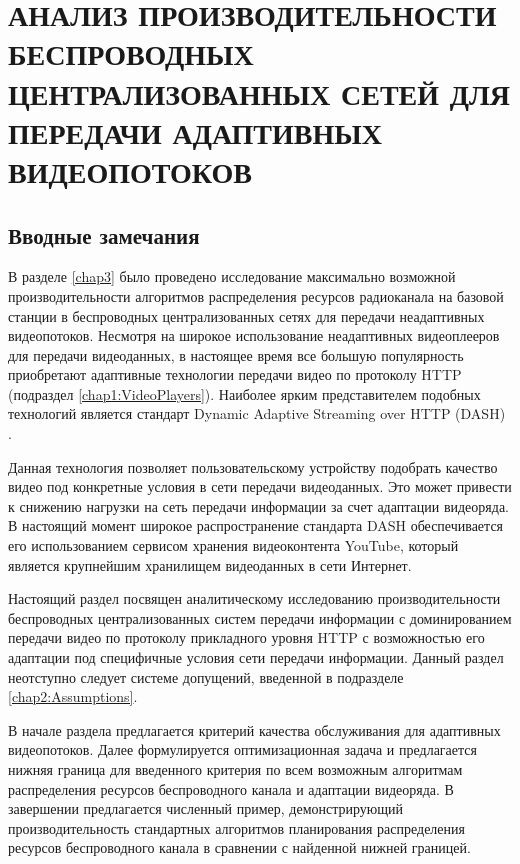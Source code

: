\chapter{АНАЛИЗ ПРОИЗВОДИТЕЛЬНОСТИ БЕСПРОВОДНЫХ ЦЕНТРАЛИЗОВАННЫХ СЕТЕЙ ДЛЯ ПЕРЕДАЧИ АДАПТИВНЫХ ВИДЕОПОТОКОВ}
\label{chap4}

\section{Вводные замечания}
\label{chap4:Intro}

В разделе \ref{chap3} было проведено исследование максимально возможной производительности алгоритмов распределения ресурсов радиоканала на базовой станции в беспроводных централизованных сетях для передачи неадаптивных видеопотоков. Несмотря на широкое использование неадаптивных видеоплееров для передачи видеоданных, в настоящее время все большую популярность приобретают адаптивные технологии передачи видео по протоколу HTTP (подраздел \ref{chap1:VideoPlayers}). Наиболее ярким представителем подобных технологий является стандарт Dynamic Adaptive Streaming over HTTP (DASH) \cite{dash_standard,conviva}.

Данная технология позволяет пользовательскому устройству подобрать качество видео под конкретные условия в сети передачи видеоданных. Это может привести к снижению нагрузки на сеть передачи информации за счет адаптации видеоряда.
В настоящий момент широкое распространение стандарта DASH обеспечивается его использованием сервисом хранения видеоконтента YouTube, который является крупнейшим хранилищем видеоданных в сети Интернет.

Настоящий раздел посвящен аналитическому исследованию производительности беспроводных централизованных систем передачи информации с доминированием передачи видео по протоколу прикладного уровня HTTP с возможностью его адаптации под специфичные условия сети передачи информации. Данный раздел неотступно следует системе допущений, введенной в подразделе \ref{chap2:Assumptions}.

В начале раздела предлагается критерий качества обслуживания для адаптивных видеопотоков. Далее формулируется оптимизационная задача и предлагается нижняя граница для введенного критерия по всем возможным алгоритмам распределения ресурсов беспроводного канала и адаптации видеоряда. В завершении предлагается численный пример, демонстрирующий производительность стандартных алгоритмов планирования распределения ресурсов беспроводного канала в сравнении с найденной нижней границей.


